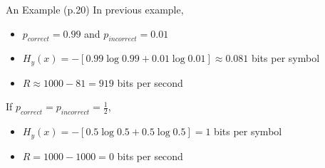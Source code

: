 \documentclass{beamer}
\begin{document}
  \begin{frame}{An Example \small (p.20)}
    In previous example,
    \begin{itemize}
      \item $p_{correct} = 0.99$ and $p_{incorrect} = 0.01$
      \item $H_y(x) = -\left[ 0.99 \log 0.99 + 0.01 \log 0.01 \right] \approx 0.081$ bits per symbol
      \item $R \approx 1000 - 81 = 919$ bits per second
    \end{itemize}
    If $p_{correct} = p_{incorrect} = \frac{1}{2}$,
    \begin{itemize}
      \item $H_y(x) = -\left[ 0.5 \log 0.5 + 0.5 \log 0.5 \right] = 1$ bits per symbol
      \item $R = 1000 - 1000 = 0$ bits per second
    \end{itemize}
  \end{frame}
\end{document}
